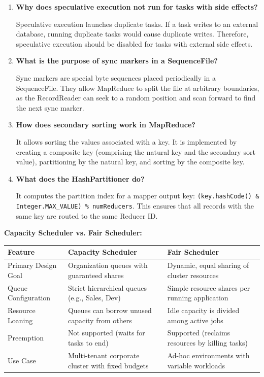 \documentclass[12pt,a4paper]{article}
\newcommand{\Q}[1]{\textbf{#1}\par\noindent\ignorespaces}
\renewcommand{\arraystretch}{1.45}
\begin{document}
\begin{tcolorbox}[exambox, title={\textbf{Frequently Asked / Viva Questions}}]
\begin{enumerate}[leftmargin=*, topsep=0pt, label=\textbf{Q\arabic*.}, itemsep=5pt]
  \item \Q{Why does speculative execution not run for tasks with side effects?}
        Speculative execution launches duplicate tasks. If a task writes to an external database, running duplicate tasks would cause duplicate writes. Therefore, speculative execution should be disabled for tasks with external side effects.
        
  \item \Q{What is the purpose of sync markers in a SequenceFile?}
        Sync markers are special byte sequences placed periodically in a SequenceFile. They allow MapReduce to split the file at arbitrary boundaries, as the RecordReader can seek to a random position and scan forward to find the next sync marker.
        
  \item \Q{How does secondary sorting work in MapReduce?}
        It allows sorting the values associated with a key. It is implemented by creating a composite key (comprising the natural key and the secondary sort value), partitioning by the natural key, and sorting by the composite key.
        
  \item \Q{What does the HashPartitioner do?}
        It computes the partition index for a mapper output key: \texttt{(key.hashCode() \& Integer.MAX\_VALUE) \% numReducers}. This ensures that all records with the same key are routed to the same Reducer ID.
\end{enumerate}
\end{tcolorbox}

\vspace{6pt}

\begin{tcolorbox}[tikzbox, title={\textbf{Comparison Snapshot}}]
\textbf{Capacity Scheduler vs. Fair Scheduler:}\par\vspace{6pt}\noindent
{\renewcommand{\arraystretch}{1.4}%
\begin{tabularx}{\linewidth}{|B{3.2cm}|Y|Y|}
\hline
\textbf{Feature} & \textbf{Capacity Scheduler} & \textbf{Fair Scheduler} \\
\hline
Primary Design Goal & Organization queues with guaranteed shares & Dynamic, equal sharing of cluster resources \\
\hline
Queue Configuration & Strict hierarchical queues (e.g., Sales, Dev) & Simple resource shares per running application \\
\hline
Resource Loaning & Queues can borrow unused capacity from others & Idle capacity is divided among active jobs \\
\hline
Preemption & Not supported (waits for tasks to end) & Supported (reclaims resources by killing tasks) \\
\hline
Use Case & Multi-tenant corporate cluster with fixed budgets & Ad-hoc environments with variable workloads \\
\hline
\end{tabularx}}
\end{tcolorbox}
\end{document}
